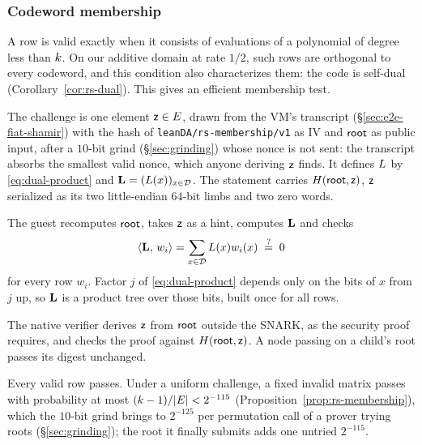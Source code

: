 \subsubsection{Codeword membership}\label{sec:da-membership}\label{sec:da-circuit}

A row is valid exactly when it consists of evaluations of a polynomial of degree less than $k$. On our additive domain at rate $1/2$, such rows are orthogonal to every codeword, and this condition also characterizes them: the code is self-dual (Corollary~\ref{cor:rs-dual}). This gives an efficient membership test.

The challenge is one element $\mathsf{z}\in E$, drawn from the VM's transcript (\S\ref{sec:e2e-fiat-shamir}) with the hash of \texttt{leanDA/rs-membership/v1} as IV and $\mathsf{root}$ as public input, after a $10$-bit grind (\S\ref{sec:grinding}) whose nonce is not sent: the transcript absorbs the smallest valid nonce, which anyone deriving $\mathsf{z}$ finds. It defines $L$ by \eqref{eq:dual-product} and $\mathbf{L}=(L(x))_{x\in\mathcal{D}}$. The statement carries $H(\mathsf{root},\mathsf{z})$, $\mathsf{z}$ serialized as its two little-endian $64$-bit limbs and two zero words.

The guest recomputes $\mathsf{root}$, takes $\mathsf{z}$ as a hint, computes $\mathbf{L}$ and checks
\[
  \langle \mathbf{L},\, w_i \rangle
  =\sum_{x\in\mathcal{D}}L(x)w_i(x)
  \;\stackrel{?}{=}\;0
\]
for every row $w_i$. Factor $j$ of \eqref{eq:dual-product} depends only on the bits of $x$ from $j$ up, so $\mathbf{L}$ is a product tree over those bits, built once for all rows.

The native verifier derives $\mathsf{z}$ from $\mathsf{root}$ outside the SNARK, as the security proof requires, and checks the proof against $H(\mathsf{root},\mathsf{z})$. A node passing on a child's root passes its digest unchanged.

Every valid row passes. Under a uniform challenge, a fixed invalid matrix passes with probability at most $(k-1)/|E|<2^{-115}$ (Proposition~\ref{prop:rs-membership}), which the $10$-bit grind brings to $2^{-125}$ per permutation call of a prover trying roots (\S\ref{sec:grinding}); the root it finally submits adds one untried $2^{-115}$.
